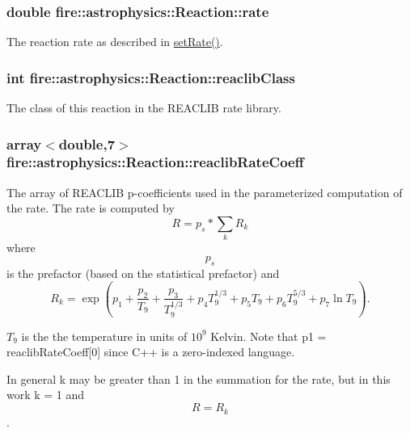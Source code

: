 \subsubsection[{\texorpdfstring{rate}{rate}}]{\setlength{\rightskip}{0pt plus 5cm}double fire\+::astrophysics\+::\+Reaction\+::rate}\hypertarget{a00242_a343553d449e3cca261f8ee166fa6b699}{}\label{a00242_a343553d449e3cca261f8ee166fa6b699}
The reaction rate as described in \hyperlink{a00242_a671a0560e6843664cdae4d724b8645da}{set\+Rate()}. 
\subsubsection[{\texorpdfstring{reaclib\+Class}{reaclibClass}}]{\setlength{\rightskip}{0pt plus 5cm}int fire\+::astrophysics\+::\+Reaction\+::reaclib\+Class}\hypertarget{a00242_a581b5410f62a299f2262324d6c0199c7}{}\label{a00242_a581b5410f62a299f2262324d6c0199c7}
The class of this reaction in the R\+E\+A\+C\+L\+IB rate library. 
\subsubsection[{\texorpdfstring{reaclib\+Rate\+Coeff}{reaclibRateCoeff}}]{\setlength{\rightskip}{0pt plus 5cm}array$<$double,7$>$ fire\+::astrophysics\+::\+Reaction\+::reaclib\+Rate\+Coeff}\hypertarget{a00242_aa6265e73f4d2c55441caf95e6eb6e656}{}\label{a00242_aa6265e73f4d2c55441caf95e6eb6e656}
The array of R\+E\+A\+C\+L\+IB p-\/coefficients used in the parameterized computation of the rate. The rate is computed by \[ R = p_s*\sum_k R_k \] where \[p_s\] is the prefactor (based on the statistical prefactor) and \[ R_k = \exp(p_1 + \frac{p_2}{T_9} + \frac{p_3}{T_9^{1/3}} + p_{4}T_9^{1/3} + p_{5}T_9 + p_{6}T_9^{5/3} + p_{7}\ln T_9). \]

$T_9$ is the the temperature in units of $10^9$ Kelvin. Note that p1 = reaclib\+Rate\+Coeff\mbox{[}0\mbox{]} since C++ is a zero-\/indexed language.

In general k may be greater than 1 in the summation for the rate, but in this work k = 1 and \[R = R_k\].

